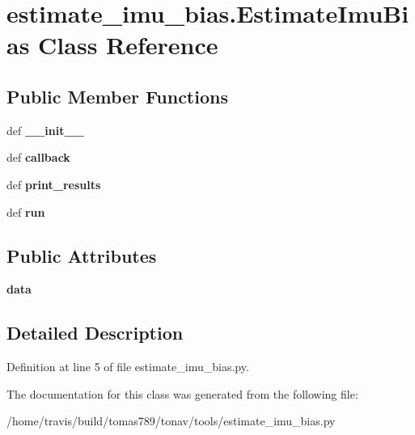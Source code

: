 \hypertarget{classestimate__imu__bias_1_1_estimate_imu_bias}{\section{estimate\-\_\-imu\-\_\-bias.\-Estimate\-Imu\-Bias Class Reference}
\label{classestimate__imu__bias_1_1_estimate_imu_bias}
}
\subsection*{Public Member Functions}
\begin{DoxyCompactItemize}
\item 
\hypertarget{classestimate__imu__bias_1_1_estimate_imu_bias_a40e254ac7e33b9e00766e799c13bfc92}{def {\bfseries \-\_\-\-\_\-init\-\_\-\-\_\-}}\label{classestimate__imu__bias_1_1_estimate_imu_bias_a40e254ac7e33b9e00766e799c13bfc92}

\item 
\hypertarget{classestimate__imu__bias_1_1_estimate_imu_bias_add0fb351b3990a7a5f48398dbd3398d1}{def {\bfseries callback}}\label{classestimate__imu__bias_1_1_estimate_imu_bias_add0fb351b3990a7a5f48398dbd3398d1}

\item 
\hypertarget{classestimate__imu__bias_1_1_estimate_imu_bias_afb5640ffe2885c00f9374d30c282c4ee}{def {\bfseries print\-\_\-results}}\label{classestimate__imu__bias_1_1_estimate_imu_bias_afb5640ffe2885c00f9374d30c282c4ee}

\item 
\hypertarget{classestimate__imu__bias_1_1_estimate_imu_bias_a1a93b692dcc7d2a79ec9dee798fbad65}{def {\bfseries run}}\label{classestimate__imu__bias_1_1_estimate_imu_bias_a1a93b692dcc7d2a79ec9dee798fbad65}

\end{DoxyCompactItemize}
\subsection*{Public Attributes}
\begin{DoxyCompactItemize}
\item 
\hypertarget{classestimate__imu__bias_1_1_estimate_imu_bias_ac85a8cfa7a9b9940e7f6ee5cadda04a0}{{\bfseries data}}\label{classestimate__imu__bias_1_1_estimate_imu_bias_ac85a8cfa7a9b9940e7f6ee5cadda04a0}

\end{DoxyCompactItemize}


\subsection{Detailed Description}


Definition at line 5 of file estimate\-\_\-imu\-\_\-bias.\-py.



The documentation for this class was generated from the following file\-:\begin{DoxyCompactItemize}
\item 
/home/travis/build/tomas789/tonav/tools/estimate\-\_\-imu\-\_\-bias.\-py\end{DoxyCompactItemize}
